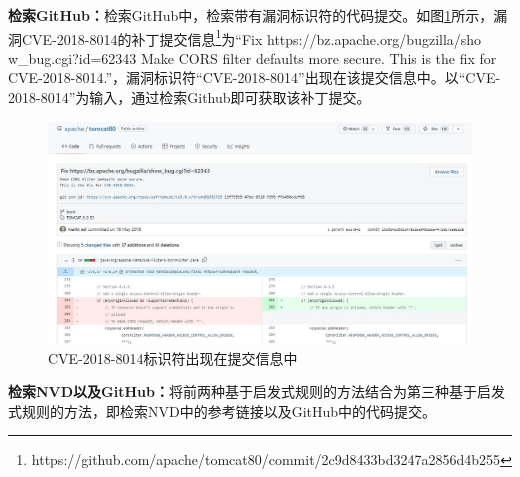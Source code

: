 \textbf{检索GitHub：}检索GitHub中，检索带有漏洞标识符的代码提交。如图\ref{fig:commitmessage}所示，漏洞CVE-2018-8014的补丁提交信息\footnote{https://github.com/apache/tomcat80/commit/2c9d8433bd3247a2856d4b255}为“Fix https://bz.apache.org/bugzilla/sho\\w\_bug.cgi?id=62343 Make CORS filter defaults more secure. This is the fix for CVE-2018-8014.”，漏洞标识符“CVE-2018-8014”出现在该提交信息中。以“CVE-2018-8014”为输入，通过检索Github即可获取该补丁提交。%
\begin{figure}[h]
    \centering
    \includegraphics[scale=0.45]{fig/CVE in commit message.jpg}
    \caption{CVE-2018-8014标识符出现在提交信息中}\label{fig:commitmessage}
\end{figure}

\textbf{检索NVD以及GitHub：}将前两种基于启发式规则的方法结合为第三种基于启发式规则的方法，即检索NVD中的参考链接以及GitHub中的代码提交。

